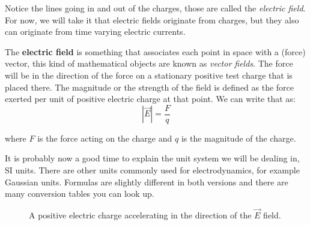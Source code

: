 Notice the lines going in and out of the charges, those are called the \emph{electric field}. For now, we will take it that electric fields originate from charges, but they also can originate from time varying electric currents. 
\begin{definition}
  The \textbf{electric field} is something that associates each point in space with a (force) vector, this kind of mathematical objects are known as \emph{vector fields}. The force will be in the direction of the force on a stationary positive test charge that is placed there. The magnitude or the strength of the field is defined as the force exerted per unit of positive electric charge at that point. We can write that as:
  \begin{equation}
    |\vec{E}| = \frac{F}{q}
  \end{equation}


  where \(F\) is the force acting on the charge and \(q\) is the magnitude of the charge.
\end{definition}


It is probably now a good time to explain the unit system we will be dealing in, SI units. There are other units commonly used for electrodynamics, for example Gaussian units. Formulas are slightly different in both versions and there are many conversion tables you can look up.
\begin{figure}[H]
  \begin{center}
    \caption{A positive electric charge accelerating in the direction of the \(\vec{E}\) field.}
  \end{center}
\end{figure}



